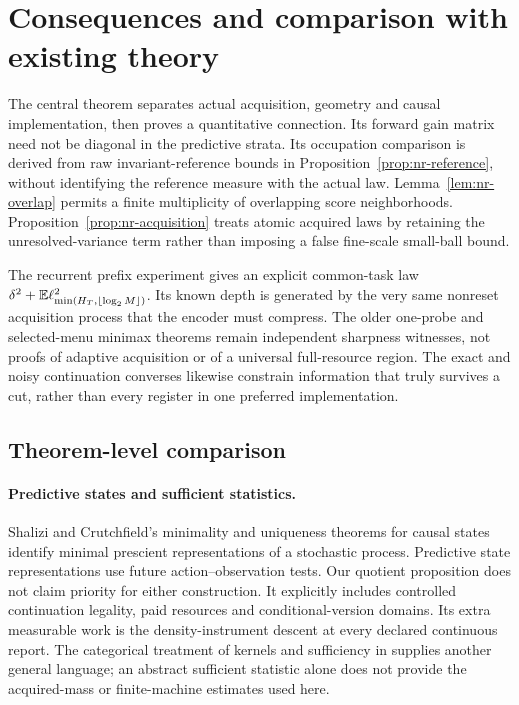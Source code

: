 \section{Consequences and comparison with existing theory}\label{sec:scope}
The central theorem separates actual acquisition, geometry and causal implementation, then proves a quantitative connection. Its forward gain matrix need not be diagonal in the predictive strata. Its occupation comparison is derived from raw invariant-reference bounds in Proposition~\ref{prop:nr-reference}, without identifying the reference measure with the actual law. Lemma~\ref{lem:nr-overlap} permits a finite multiplicity of overlapping score neighborhoods. Proposition~\ref{prop:nr-acquisition} treats atomic acquired laws by retaining the unresolved-variance term rather than imposing a false fine-scale small-ball bound.

The recurrent prefix experiment gives an explicit common-task law $\delta^2+\mathbb E\ell_{\min(H_T,\lfloor\log_2M\rfloor)}^2$. Its known depth is generated by the very same nonreset acquisition process that the encoder must compress. The older one-probe and selected-menu minimax theorems remain independent sharpness witnesses, not proofs of adaptive acquisition or of a universal full-resource region. The exact and noisy continuation converses likewise constrain information that truly survives a cut, rather than every register in one preferred implementation.

\subsection{Theorem-level comparison}
\paragraph{Predictive states and sufficient statistics.}
Shalizi and Crutchfield's minimality and uniqueness theorems for causal states \cite[Theorems 2--3]{shalizi} identify minimal prescient representations of a stochastic process. Predictive state representations \cite{psr} use future action--observation tests. Our quotient proposition does not claim priority for either construction. It explicitly includes controlled continuation legality, paid resources and conditional-version domains. Its extra measurable work is the density-instrument descent at every declared continuous report. The categorical treatment of kernels and sufficiency in \cite{fritz} supplies another general language; an abstract sufficient statistic alone does not provide the acquired-mass or finite-machine estimates used here.

